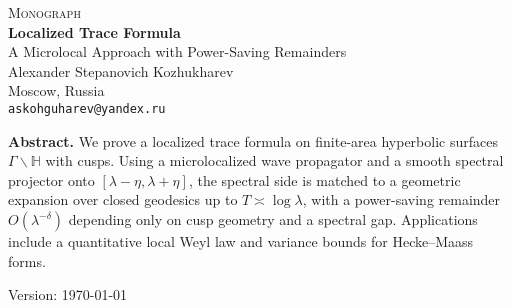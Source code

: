 \documentclass[11pt,a4paper]{article}
\numberwithin{equation}{section}
\begin{document}
\begin{titlepage}
  \centering
  \vspace*{6mm}
  {\Large\scshape Monograph}\\[12mm]
  {\LARGE\bfseries Localized Trace Formula}\\[4mm]
  {\large A Microlocal Approach with Power-Saving Remainders}\\[16mm]

  {\large Alexander Stepanovich Kozhukharev}\\[2mm]
  Moscow, Russia\\[1mm]
  \texttt{askohguharev@yandex.ru}\\[14mm]

  \vfill
  \begin{minipage}{0.92\textwidth}
  \begin{tcolorbox}[colback=white,colframe=black!15,sharp corners,boxrule=0.3pt]
    \small
    \textbf{Abstract.}\;
    We prove a localized trace formula on finite-area hyperbolic surfaces
    $\Gamma\backslash\mathbb H$ with cusps. Using a microlocalized wave propagator
    and a smooth spectral projector onto $[\lambda-\eta,\lambda+\eta]$, the spectral
    side is matched to a geometric expansion over closed geodesics up to
    $T\asymp\log\lambda$, with a power-saving remainder $O(\lambda^{-\delta})$
    depending only on cusp geometry and a spectral gap. Applications include a
    quantitative local Weyl law and variance bounds for Hecke–Maass forms.
  \end{tcolorbox}
  \end{minipage}

  \vfill
  {\small Version: \today}
\end{titlepage}

\tableofcontents
\clearpage













\end{document}
